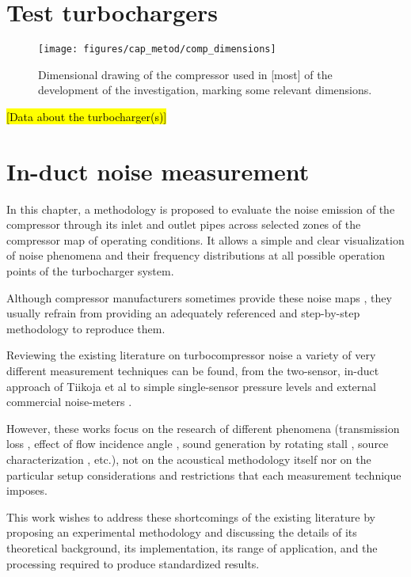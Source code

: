 \section{Test turbochargers}

\begin{figure}[h!]
\centering
\texttt{[image: figures/cap\_metod/comp\_dimensions]}
\caption{Dimensional drawing of the compressor used in [most] of the development of the investigation, marking some relevant dimensions.}
\label{fig:comp_dimens}
\end{figure}

\hl{[Data about the turbocharger(s)]}

\section{In-duct noise measurement} %

In this chapter, a methodology is proposed to evaluate the noise emission of the compressor through its inlet and outlet pipes across selected zones of the compressor map of operating conditions. It allows a simple and clear visualization of noise phenomena and their frequency distributions at all  possible operation points of the turbocharger system.

Although compressor manufacturers sometimes provide these noise maps \cite{gaude2008experimental}, they usually refrain from providing an adequately referenced and step-by-step methodology to reproduce them.

Reviewing the existing literature on turbocompressor noise a variety of very different measurement techniques can be found, from the two-sensor, in-duct approach of Tiikoja et al \cite{tiikoja2011inves} to simple single-sensor pressure levels and external commercial noise-meters \cite{figurella2012noise}.

However, these works focus on the research of different phenomena (transmission loss \cite{tiikoja2011inves}, effect of flow incidence angle \cite{figurella2012noise}, sound generation by rotating stall \cite{mongeau1993sound}, source characterization \cite{mongeau1995method}, etc.), not on the acoustical methodology itself nor on the particular setup considerations and restrictions that each measurement technique imposes.

This work wishes to address these shortcomings of the existing literature by proposing an experimental methodology and discussing the details of its theoretical background, its implementation, its range of application, and the  processing required to produce standardized results.

